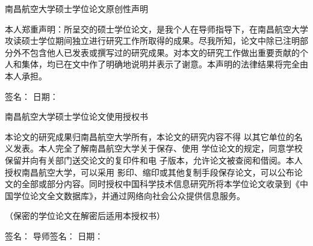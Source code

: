 \documentclass[UTF8,12pt, AutoFakeBold,fontset = founder]{ctexart}
\begin{document}
{
\newpage
\thispagestyle{empty}
\thispagestyle{empty}

\begin{center}
    \vspace{21.6pt}
     {\fontsize{18}{21.6}\selectfont\heiti  南昌航空大学硕士学位论文原创性声明}
\end{center}
\vspace{12.6pt}
\begin{spacing}{1.9}
本人郑重声明：所呈交的硕士学位论文，是我个人在导师指导下，在南昌航空大学攻读硕士学位期间独立进行研究工作所取得的成果。尽我所知，论文中除已注明部分外不包含他人已发表或撰写过的研究成果。对本文的研究工作做出重要贡献的个人和集体，均已在文中作了明确地说明并表示了谢意。本声明的法律结果将完全由本人承担。
\end{spacing}

\vspace{16.8pt}
{ 签名：\underline{\hspace{5cm}} \hspace{1cm} 日期：\underline{\hspace{5cm}}}

\vspace{34.2pt}

\begin{center}
    {\fontsize{18}{21.6}\selectfont\heiti  南昌航空大学硕士学位论文使用授权书}
\end{center}
\vspace{16.8pt}
\begin{spacing}{1.9}
本论文的研究成果归南昌航空大学所有，本论文的研究内容不得
以其它单位的名义发表。本人完全了解南昌航空大学关于保存、使用
学位论文的规定，同意学校保留并向有关部门送交论文的复印件和电
子版本，允许论文被查阅和借阅。本人授权南昌航空大学，可以采用
影印、缩印或其他复制手段保存论文，可以公布论文的全部或部分内容。同时授权中国科学技术信息研究所将本学位论文收录到《中国学位论文全文数据库》，并通过网络向社会公众提供信息服务。
\end{spacing}

{（保密的学位论文在解密后适用本授权书）}

\vspace{16.8pt}
{ \noindent
签名：\underline{\hspace{3cm}} 导师签名：\underline{\hspace{3cm}} 日期：\underline{\hspace{3cm}}}

}
\end{document}
